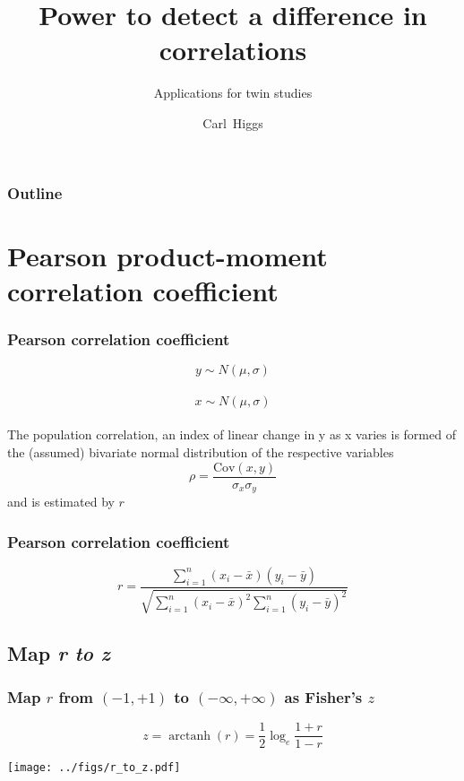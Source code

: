 \documentclass{beamer}
\title{Power to detect a difference in correlations}
\subtitle{Applications for twin studies}
\author{Carl~Higgs\inst{1}}
\institute[Affiliation] %
{
  \inst{1}%
  Centre for Epidemiology and Biostatistics\\
  School of Population and Global Health\\
  University of Melbourne
}
\date[March 2018] %
\DeclareMathOperator\arctanh{arctanh}
\newcommand{\Cov}{\mathrm{Cov}}
\begin{document}
  \frame{\titlepage}
  
   \begin{frame}
       \frametitle{Outline}
   \end{frame}

  \section{Pearson product-moment correlation coefficient}
  \begin{frame}
    \frametitle{Pearson correlation coefficient}
    \[y \sim N(\mu,\sigma)\] \\
    \[x \sim N(\mu,\sigma)\] \\
    The population correlation, an index of linear change in y as x varies is formed of the (assumed) bivariate normal distribution of the respective variables  \\
    \[\rho = \frac{\Cov(x,y)}{\sigma_x \sigma_y} \]
    and is estimated by \(r\)
  \end{frame}  
  
  \begin{frame}
    \frametitle{Pearson correlation coefficient}
    \[r = \frac{\sum_{i=1}^{n} (x_i - \bar{x})(y_i - \bar{y})}{\sqrt{\sum_{i=1}^{n} (x_i - \bar{x})^2 \sum_{i=1}^{n} (y_i - \bar{y})^2}}\]
  \end{frame}

  \subsection{Map \it{r} to \it{z}} 
  \begin{frame}
    \frametitle{Map \(r\) from \((-1,+1)\) to \((-\infty,+\infty)\) as Fisher's \(z\) }
    \[z     = \arctanh(r) = \frac{1}{2} \log_e \frac{1+r}{1-r} \]
    \begin{center}
      \texttt{[image: ../figs/r\_to\_z.pdf]}
    \end{center}
  \end{frame}
\end{document}
